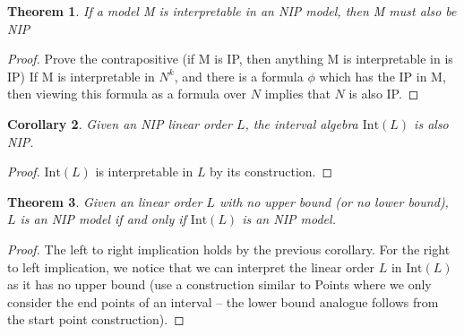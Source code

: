 \documentclass[11pt %
              ]{article}
\newcommand{\inter}[1][-]{\text{Int}\left(#1\right)}
\theoremstyle{plain}
\newtheorem{thm}{Theorem}%
\newtheorem{cor}[thm]{Corollary}
\theoremstyle{definition}
\theoremstyle{remark}
\begin{document}
\begin{thm}
  If a model M is interpretable in an NIP model, then M must also be NIP
\end{thm}
\begin{proof}
  Prove the contrapositive (if M is IP, then anything M is interpretable in is IP)
  If M is interpretable in $N^k$, and there is a formula $\phi$ which has the IP in M,
  then viewing this formula as a formula over $N$ implies that $N$ is also IP.
\end{proof}

\begin{cor}
  Given an NIP linear order $L$, the interval algebra $\inter[L]$ is also NIP.
\end{cor}
\begin{proof}
  $\inter[L]$ is interpretable in $L$ by its construction.
\end{proof}

\begin{thm}
  Given an linear order $L$ with no upper bound (or no lower bound), $L$ is an NIP model if and only
  if $\inter[L]$ is an NIP model.
\end{thm}
\begin{proof}
  The left to right implication holds by the previous corollary.
  For the right to left implication, we notice that we can interpret the linear order $L$ in
  $\inter[L]$ as it has no upper bound (use a construction similar to Points where we only consider
  the end points of an interval -- the lower bound analogue follows from the start point
  construction).
\end{proof}
\end{document}
